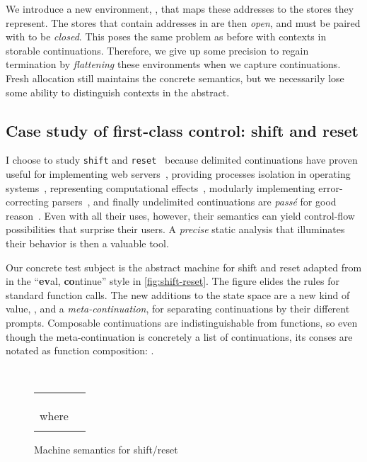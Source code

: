 We introduce a new environment, , that maps these addresses to the stores they represent.
The stores that contain addresses in  are then \emph{open}, and must be paired with  to be \emph{closed}.
This poses the same problem as before with contexts in storable continuations.
Therefore, we give up some precision to regain termination by \emph{flattening} these environments when we capture continuations.
Fresh allocation still maintains the concrete semantics, but we necessarily lose some ability to distinguish contexts in the abstract.


\subsection{Case study of first-class control: shift and reset}
I choose to study {\tt shift} and {\tt reset}~\citep{ianjohnson:danvy:filinski:delim:1990} because delimited continuations have proven useful for implementing web servers~\citep{dvanhorn:Queinnec2004Continuations,jay-communication}, providing processes isolation in operating systems~\citep{dvanhorn:Kiselyov2007Delimited}, representing computational effects~\citep{dvanhorn:Filinski1994Representing}, modularly implementing error-correcting parsers~\citep{dvanhorn:Shivers2011Modular}, and finally undelimited continuations are \emph{pass\'e} for good reason~\citep{ianjohnson:kiselyov:against-callcc}.
Even with all their uses, however, their semantics can yield control-flow possibilities that surprise their users.
A \emph{precise} static analysis that illuminates their behavior is then a valuable tool.


Our concrete test subject is the abstract machine for shift and reset adapted from \citet{ianjohnson:Biernacki2006274} in the ``{\bf ev}al, {\bf co}ntinue'' style in \autoref{fig:shift-reset}.
The figure elides the rules for standard function calls.
The new additions to the state space are a new kind of value, , and a \emph{meta-continuation},  for separating continuations by their different prompts.
Composable continuations are indistinguishable from functions, so even though the meta-continuation is concretely a list of continuations, its conses are notated as function composition: .

\begin{figure}
  \centering
   \\
  \begin{tabular}{r|l}\hline

    &
    
\\

    &
    
\\

    &
    
    \\
    where & 
\\

    &
    
\end{tabular}  
  \caption{Machine semantics for shift/reset}
  \label{fig:shift-reset}
\end{figure}


